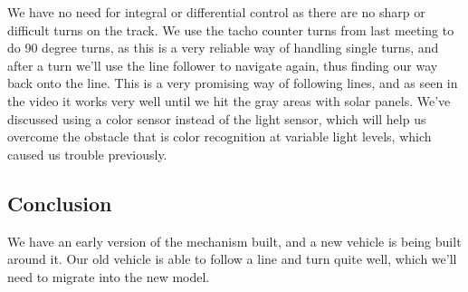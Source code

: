 We have no need for integral or differential control as there are no
sharp or difficult turns on the track. We use the tacho counter turns
from last meeting to do 90 degree turns, as this is a very reliable way
of handling single turns, and after a turn we'll use the line follower
to navigate again, thus finding our way back onto the line. This is a
very promising way of following lines, and as seen in the video it works
very well until we hit the gray areas with solar panels. We've discussed
using a color sensor instead of the light sensor, which will help us
overcome the obstacle that is color recognition at variable light
levels, which caused us trouble previously.

\subsection{Conclusion}

We have an early version of the mechanism built, and a new vehicle is
being built around it. Our old vehicle is able to follow a line and turn
quite well, which we'll need to migrate into the new model.
